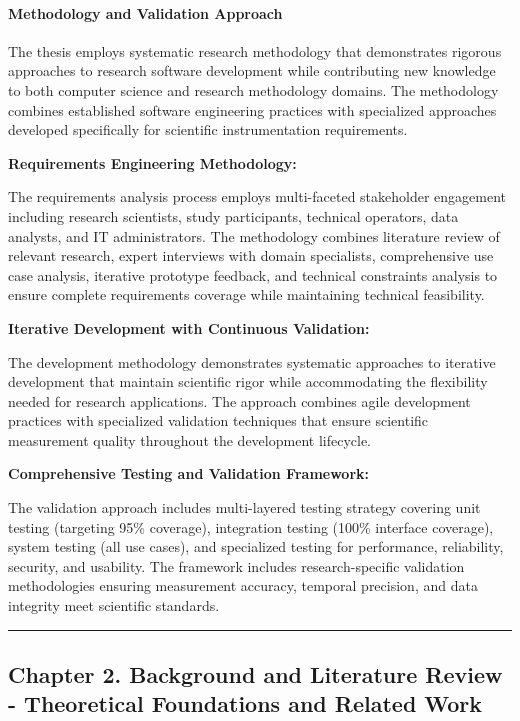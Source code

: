 \documentclass[12pt,a4paper]{report}
\begin{document}
\paragraph{Methodology and Validation Approach}

The thesis employs systematic research methodology that demonstrates rigorous approaches to research software
development while contributing new knowledge to both computer science and research methodology domains. The methodology
combines established software engineering practices with specialized approaches developed specifically for scientific
instrumentation requirements.

\textbf{Requirements Engineering Methodology:}

The requirements analysis process employs multi-faceted stakeholder engagement including research scientists, study
participants, technical operators, data analysts, and IT administrators. The methodology combines literature review of
relevant research, expert interviews with domain specialists, comprehensive use case analysis, iterative prototype
feedback, and technical constraints analysis to ensure complete requirements coverage while maintaining technical
feasibility.

\textbf{Iterative Development with Continuous Validation:}

The development methodology demonstrates systematic approaches to iterative development that maintain scientific rigor
while accommodating the flexibility needed for research applications. The approach combines agile development practices
with specialized validation techniques that ensure scientific measurement quality throughout the development lifecycle.

\textbf{Comprehensive Testing and Validation Framework:}

The validation approach includes multi-layered testing strategy covering unit testing (targeting 95\% coverage),
integration testing (100\% interface coverage), system testing (all use cases), and specialized testing for performance,
reliability, security, and usability. The framework includes research-specific validation methodologies ensuring
measurement accuracy, temporal precision, and data integrity meet scientific standards.

\hrule

\subsection{Chapter 2. Background and Literature Review - Theoretical Foundations and Related Work}
\end{document}
